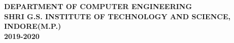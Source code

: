 \begin{titlepage}
\begin{minipage}[t]{0.45\textwidth}
    \end{minipage}
    
    \vspace*{\fill}

    \large
    \textbf{DEPARTMENT OF COMPUTER ENGINEERING \\
    SHRI G.S. INSTITUTE OF TECHNOLOGY AND SCIENCE, INDORE(M.P.)\\
    2019-2020
    }
\end{titlepage}